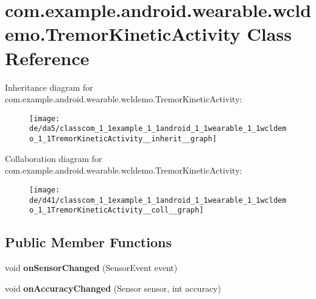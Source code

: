 \hypertarget{classcom_1_1example_1_1android_1_1wearable_1_1wcldemo_1_1TremorKineticActivity}{}\section{com.\+example.\+android.\+wearable.\+wcldemo.\+Tremor\+Kinetic\+Activity Class Reference}
\label{classcom_1_1example_1_1android_1_1wearable_1_1wcldemo_1_1TremorKineticActivity}


Inheritance diagram for com.\+example.\+android.\+wearable.\+wcldemo.\+Tremor\+Kinetic\+Activity\+:\nopagebreak
\begin{figure}[H]
\begin{center}
\leavevmode
\texttt{[image: de/da5/classcom\_1\_1example\_1\_1android\_1\_1wearable\_1\_1wcldemo\_1\_1TremorKineticActivity\_\_inherit\_\_graph]}
\end{center}
\end{figure}


Collaboration diagram for com.\+example.\+android.\+wearable.\+wcldemo.\+Tremor\+Kinetic\+Activity\+:\nopagebreak
\begin{figure}[H]
\begin{center}
\leavevmode
\texttt{[image: de/d41/classcom\_1\_1example\_1\_1android\_1\_1wearable\_1\_1wcldemo\_1\_1TremorKineticActivity\_\_coll\_\_graph]}
\end{center}
\end{figure}
\subsection*{Public Member Functions}
\begin{DoxyCompactItemize}
\item 
void {\bfseries on\+Sensor\+Changed} (Sensor\+Event event)\hypertarget{classcom_1_1example_1_1android_1_1wearable_1_1wcldemo_1_1TremorKineticActivity_a69319643549ff4dccbfdd539e629a10f}{}\label{classcom_1_1example_1_1android_1_1wearable_1_1wcldemo_1_1TremorKineticActivity_a69319643549ff4dccbfdd539e629a10f}

\item 
void {\bfseries on\+Accuracy\+Changed} (Sensor sensor, int accuracy)\hypertarget{classcom_1_1example_1_1android_1_1wearable_1_1wcldemo_1_1TremorKineticActivity_aaec5829c3d76d1a0921721cabff36cdd}{}\label{classcom_1_1example_1_1android_1_1wearable_1_1wcldemo_1_1TremorKineticActivity_aaec5829c3d76d1a0921721cabff36cdd}

\end{DoxyCompactItemize}
